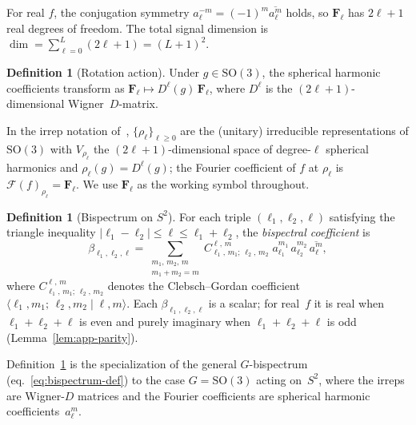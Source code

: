 \documentclass{article}
\theoremstyle{definition}
\newtheorem{definition}[theorem]{Definition}
\theoremstyle{remark}
\newcommand{\SO}{\mathrm{SO}}
\newcommand{\CG}[6]{C^{#5,\,#6}_{#1,\,#2;\,#3,\,#4}}
\newcommand{\abs}[1]{\lvert #1 \rvert}
\newcommand{\conj}[1]{\overline{#1}}
\theoremstyle{definition}
\begin{document}
\noindent
For real $f$, the conjugation symmetry
$a_\ell^{-m} = (-1)^m \conj{a_\ell^m}$ holds, so
$\mathbf{F}_\ell$ has $2\ell+1$ real degrees of freedom.
The total signal dimension is
$\dim = \sum_{\ell=0}^{L}(2\ell+1) = (L+1)^2$.

\begin{definition}[Rotation action]
Under $g \in \SO(3)$, the spherical harmonic coefficients transform as
$\mathbf{F}_\ell \mapsto D^\ell(g)\,\mathbf{F}_\ell$,
where $D^\ell$ is the $(2\ell+1)$-dimensional Wigner~$D$-matrix.
\end{definition}

\noindent
In the irrep notation of~\citet{mataigne2024selective},
$\{\rho_\ell\}_{\ell\ge 0}$ are the (unitary) irreducible
representations of $\SO(3)$ with $V_{\rho_\ell}$ the
$(2\ell{+}1)$-dimensional space of degree-$\ell$ spherical harmonics
and $\rho_\ell(g)=D^\ell(g)$; the Fourier coefficient of $f$ at
$\rho_\ell$ is $\mathcal{F}(f)_{\rho_\ell}=\mathbf{F}_\ell$. We use
$\mathbf{F}_\ell$ as the working symbol throughout.

\begin{definition}[Bispectrum on $S^2$]\label{def:app-bispectrum}
For each triple $(\ell_1, \ell_2, \ell)$ satisfying the triangle
inequality $\abs{\ell_1 - \ell_2} \le \ell \le \ell_1 + \ell_2$,
the \emph{bispectral coefficient} is
\begin{equation}\label{eq:app-bispectrum}
  \beta_{\ell_1,\ell_2,\ell}
  = \sum_{\substack{m_1,\,m_2,\,m \\ m_1+m_2=m}}
    \CG{\ell_1}{m_1}{\ell_2}{m_2}{\ell}{m}\;
    a_{\ell_1}^{m_1}\,a_{\ell_2}^{m_2}\,\conj{a_\ell^m},
\end{equation}
where $\CG{\ell_1}{m_1}{\ell_2}{m_2}{\ell}{m}$ denotes the
Clebsch--Gordan coefficient
$\langle \ell_1, m_1;\, \ell_2, m_2 \mid \ell, m \rangle$.
Each $\beta_{\ell_1,\ell_2,\ell}$ is a scalar; for real~$f$ it is
real when $\ell_1{+}\ell_2{+}\ell$ is even and purely imaginary when
$\ell_1{+}\ell_2{+}\ell$ is odd (Lemma~\ref{lem:app-parity}).
\end{definition}

Definition~\ref{def:app-bispectrum} is the specialization of the
general $G$-bispectrum (eq.~\eqref{eq:bispectrum-def}) to the case
$G = \SO(3)$ acting on~$S^2$, where the irreps are Wigner-$D$
matrices and the Fourier coefficients are spherical harmonic
coefficients~$a_\ell^m$.
\end{document}
